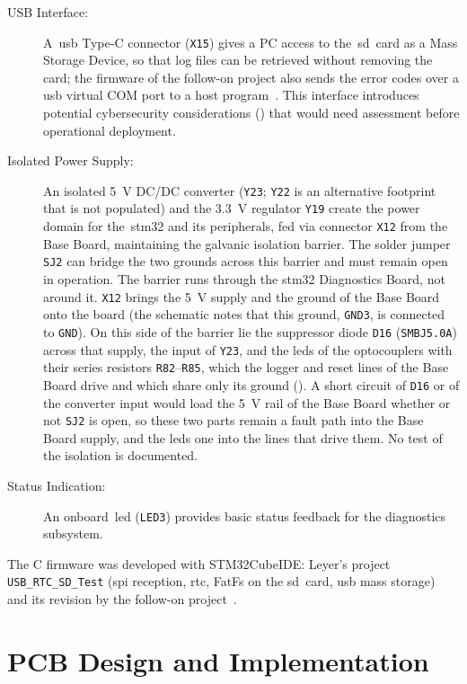\begin{description}
	\item[USB Interface:] A~\gls{usb} Type-C connector (\texttt{X15}) gives a PC access to the~\gls{sd}~card as a Mass Storage Device, so that log files can be retrieved without removing the card; the firmware of the follow-on project also sends the error codes over a \gls{usb} virtual COM port to a host program~\cite[pp.~17, 19]{savchuk2025}. This interface introduces potential cybersecurity considerations () that would need assessment before operational deployment.
	\item[Isolated Power Supply:] An isolated \SI{5}{\volt} DC/DC converter (\texttt{Y23}; \texttt{Y22} is an alternative footprint that is not populated) and the \SI{3.3}{\volt} regulator \texttt{Y19} create the power domain for the~\gls{stm32} and its peripherals, fed via connector \texttt{X12} from the Base Board, maintaining the galvanic isolation barrier. The solder jumper \texttt{SJ2} can bridge the two grounds across this barrier and must remain open in operation. The barrier runs through the \gls{stm32} Diagnostics Board, not around it. \texttt{X12} brings the \SI{5}{\volt} supply and the ground of the Base Board onto the board (the schematic notes that this ground, \texttt{GND3}, is connected to \texttt{GND}). On this side of the barrier lie the suppressor diode \texttt{D16} (\texttt{SMBJ5.0A}) across that supply, the input of \texttt{Y23}, and the \glspl{led} of the optocouplers with their series resistors \texttt{R82}--\texttt{R85}, which the logger and reset lines of the Base Board drive and which share only its ground (). A short circuit of \texttt{D16} or of the converter input would load the \SI{5}{\volt} rail of the Base Board whether or not \texttt{SJ2} is open, so these two parts remain a fault path into the Base Board supply, and the \glspl{led} one into the lines that drive them. No test of the isolation is documented.
	\item[Status Indication:] An onboard~\gls{led} (\texttt{LED3}) provides basic status feedback for the diagnostics subsystem.
\end{description}
The C firmware was developed with STM32CubeIDE: Leyer's project \texttt{USB\_RTC\_SD\_Test} (\gls{spi} reception, \gls{rtc}, FatFs on the \gls{sd}~card, \gls{usb} mass storage)~\cite{leyer2023} and its revision by the follow-on project~\cite[pp.~16--19]{savchuk2025}.

\section{PCB Design and Implementation}
\label{sec:pcb_design_impl}

